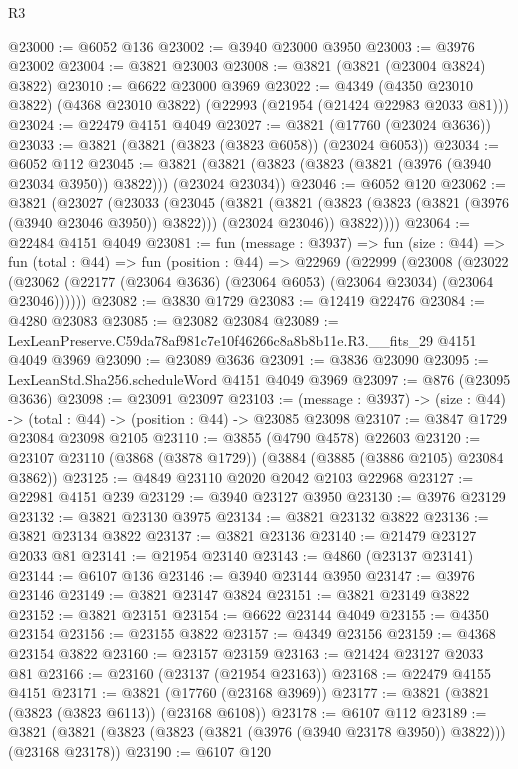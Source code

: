 \begin{lexlean}{R3}
\begin{coremodule}
@23000 := @6052 @136
@23002 := @3940 @23000 @3950
@23003 := @3976 @23002
@23004 := @3821 @23003
@23008 := @3821 (@3821 (@23004 @3824) @3822)
@23010 := @6622 @23000 @3969
@23022 := @4349
    (@4350 @23010 @3822)
    (@4368 @23010 @3822)
    (@22993 (@21954 (@21424 @22983 @2033 @81)))
@23024 := @22479 @4151 @4049
@23027 := @3821 (@17760 (@23024 @3636))
@23033 := @3821 (@3821 (@3823 (@3823 @6058)) (@23024 @6053))
@23034 := @6052 @112
@23045 := @3821 (@3821 (@3823 (@3823 (@3821 (@3976 (@3940 @23034 @3950)) @3822))) (@23024 @23034))
@23046 := @6052 @120
@23062 := @3821
    (@23027
      (@23033
        (@23045
          (@3821
            (@3821 (@3823 (@3823 (@3821 (@3976 (@3940 @23046 @3950)) @3822))) (@23024 @23046))
            @3822))))
@23064 := @22484 @4151 @4049
@23081 := fun (message : @3937) =>
  fun (size : @44) =>
  fun (total : @44) =>
  fun (position : @44) =>
  @22969
    (@22999
      (@23008
        (@23022 (@23062 (@22177 (@23064 @3636) (@23064 @6053) (@23064 @23034) (@23064 @23046))))))
@23082 := @3830 @1729
@23083 := @12419 @22476
@23084 := @4280 @23083
@23085 := @23082 @23084
@23089 := LexLeanPreserve.C59da78af981c7e10f46266c8a8b8b11e.R3.__fits_29 @4151 @4049 @3969
@23090 := @23089 @3636
@23091 := @3836 @23090
@23095 := LexLeanStd.Sha256.scheduleWord @4151 @4049 @3969
@23097 := @876 (@23095 @3636)
@23098 := @23091 @23097
@23103 := (message : @3937) -> (size : @44) -> (total : @44) -> (position : @44) -> @23085 @23098
@23107 := @3847 @1729 @23084 @23098 @2105
@23110 := @3855 (@4790 @4578) @22603
@23120 := @23107 @23110 (@3868 (@3878 @1729)) (@3884 (@3885 (@3886 @2105) @23084 @3862))
@23125 := @4849 @23110 @2020 @2042 @2103 @22968
@23127 := @22981 @4151 @239
@23129 := @3940 @23127 @3950
@23130 := @3976 @23129
@23132 := @3821 @23130 @3975
@23134 := @3821 @23132 @3822
@23136 := @3821 @23134 @3822
@23137 := @3821 @23136
@23140 := @21479 @23127 @2033 @81
@23141 := @21954 @23140
@23143 := @4860 (@23137 @23141)
@23144 := @6107 @136
@23146 := @3940 @23144 @3950
@23147 := @3976 @23146
@23149 := @3821 @23147 @3824
@23151 := @3821 @23149 @3822
@23152 := @3821 @23151
@23154 := @6622 @23144 @4049
@23155 := @4350 @23154
@23156 := @23155 @3822
@23157 := @4349 @23156
@23159 := @4368 @23154 @3822
@23160 := @23157 @23159
@23163 := @21424 @23127 @2033 @81
@23166 := @23160 (@23137 (@21954 @23163))
@23168 := @22479 @4155 @4151
@23171 := @3821 (@17760 (@23168 @3969))
@23177 := @3821 (@3821 (@3823 (@3823 @6113)) (@23168 @6108))
@23178 := @6107 @112
@23189 := @3821 (@3821 (@3823 (@3823 (@3821 (@3976 (@3940 @23178 @3950)) @3822))) (@23168 @23178))
@23190 := @6107 @120

\end{coremodule}
\end{lexlean}
